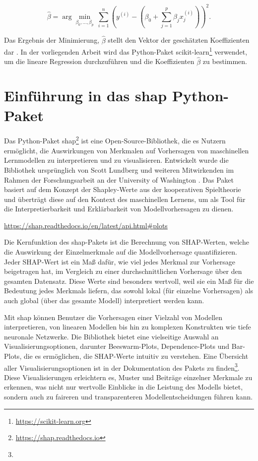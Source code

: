 \begin{equation}
    \hat{\beta} = \arg \underset{\beta_0, \ldots, \beta_p}{\min} \ \sum_{i=1}^{n} \left( y^{(i)} - \left( \beta_0 + \sum_{j=1}^{p} \beta_j x_j^{(i)}\right)\right)^2.
\end{equation}

Das Ergebnis der Minimierung, \( \hat{\beta} \) stellt den Vektor der geschätzten Koeffizienten dar \cite[S. 37]{Molnar_2022}. 
In der vorliegenden Arbeit wird das Python-Paket \textsf{scikit-learn}\footnote{\url{https://scikit-learn.org}} verwendet, um die lineare Regression durchzuführen und die Koeffizienten 
\( \hat{\beta} \) zu bestimmen. 


\section{Einführung in das \textsf{shap} Python-Paket}
\label{sec:shap-package}

Das Python-Paket \textsf{shap}\footnote{\url{https://shap.readthedocs.io}} ist eine Open-Source-Bibliothek, die es Nutzern ermöglicht, 
die Auswirkungen von Merkmalen auf Vorhersagen von maschinellen Lernmodellen zu interpretieren und zu visualisieren. 
Entwickelt wurde die Bibliothek ursprünglich von Scott Lundberg und weiteren Mitwirkenden im Rahmen der Forschungsarbeit 
an der University of Washington \cite{NIPS2017_8a20a862}. Das Paket basiert auf dem Konzept der Shapley-Werte aus der kooperativen Spieltheorie 
und überträgt diese auf den Kontext des maschinellen Lernens, um als Tool für die Interpretierbarkeit und Erklärbarkeit 
von Modellvorhersagen zu dienen.

\urldef{\ploturl}\url{https://shap.readthedocs.io/en/latest/api.html#plots}

Die Kernfunktion des \textsf{shap}-Pakets ist die Berechnung von SHAP-Werten, welche die Auswirkung der 
Einzelmerkmale auf die Modellvorhersage quantifizieren. Jeder SHAP-Wert ist ein Maß dafür, wie viel jedes Merkmal 
zur Vorhersage beigetragen hat, im Vergleich zu einer durchschnittlichen Vorhersage über den gesamten Datensatz. 
Diese Werte sind besonders wertvoll, weil sie ein Maß für die Bedeutung jedes Merkmals liefern, 
das sowohl lokal (für einzelne Vorhersagen) als auch global (über das gesamte Modell) interpretiert werden kann.

Mit \textsf{shap} können Benutzer die Vorhersagen einer Vielzahl von Modellen interpretieren, 
von linearen Modellen bis hin zu komplexen Konstrukten wie tiefe neuronale Netzwerke. 
Die Bibliothek bietet eine vielseitige Auswahl an Visualisierungsoptionen, darunter Beeswarm-Plots, Dependence-Plots und 
Bar-Plots, die es ermöglichen, die SHAP-Werte intuitiv zu verstehen. Eine Übersicht aller Visualisierungsoptionen ist in der Dokumentation 
des Pakets zu finden\footnote{\ploturl}.
Diese Visualisierungen erleichtern es, Muster und Beiträge einzelner Merkmale zu erkennen, 
was nicht nur wertvolle Einblicke in die Leistung des Modells bietet, sondern auch zu faireren und transparenteren 
Modellentscheidungen führen kann. 

